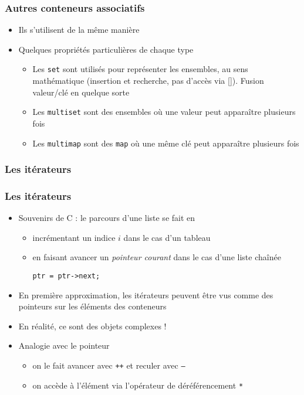 \begin{frame}[fragile]\frametitle{Autres conteneurs associatifs}
\begin{itemize}
\item Ils s'utilisent de la même manière
\item Quelques propriétés particulières de chaque type
\begin{itemize}
\item Les \verb|set|  sont utilisés pour représenter les ensembles, au sens mathématique (insertion et recherche, pas d'accès via []). Fusion valeur/clé en quelque sorte
\item Les \verb|multiset|  sont des ensembles où une valeur peut apparaître plusieurs fois
\item Les \verb|multimap|  sont des \verb|map| où une même clé peut apparaître plusieurs fois
\end{itemize}
\end{itemize}
\end{frame}

\subsubsection{Les itérateurs}

\begin{frame}[fragile]\frametitle{Les itérateurs}
\begin{itemize}
\item Souvenirs de C : le parcours d'une liste se fait en
\begin{itemize}
\item incrémentant un indice $i$ dans le cas d'un tableau
\item en faisant avancer un \textit{pointeur courant} dans le cas d'une liste chaînée
\begin{lstlisting}
ptr = ptr->next;
\end{lstlisting}
\end{itemize}
\item En première approximation, les itérateurs peuvent être vus comme des pointeurs sur les éléments des conteneurs
\item En réalité, ce sont des objets complexes !
\item Analogie avec le pointeur
\begin{itemize}
\item on le fait avancer avec \texttt{++} et reculer avec \texttt{--}
\item on accède à l'élément via l'opérateur de déréférencement \texttt{*}
\end{itemize}
\end{itemize}
\end{frame}

